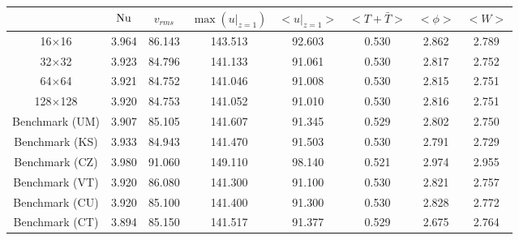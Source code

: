\begin{tabular}{c|ccccccc}
    & $\mathrm{Nu}$ & $v_{rms}$ & $\max(u|_{z=1})$ & $<u|_{z=1}>$ & $<T + \bar{T}>$ & $<\phi>$ & $<W>$ \\
\hline
16$\times$16 & 3.964 & 86.143 & 143.513 & 92.603 & 0.530 & 2.862 & 2.789 \\
32$\times$32 & 3.923 & 84.796 & 141.133 & 91.061 & 0.530 & 2.817 & 2.752 \\
64$\times$64 & 3.921 & 84.752 & 141.046 & 91.008 & 0.530 & 2.815 & 2.751 \\
128$\times$128 & 3.920 & 84.753 & 141.052 & 91.010 & 0.530 & 2.816 & 2.751 \\
\hline
Benchmark (UM) & 3.907 & 85.105 & 141.607 & 91.345 & 0.529 & 2.802 & 2.750 \\
Benchmark (KS) & 3.933 & 84.943 & 141.470 & 91.503 & 0.530 & 2.791 & 2.729 \\
Benchmark (CZ) & 3.980 & 91.060 & 149.110 & 98.140 & 0.521 & 2.974 & 2.955 \\
Benchmark (VT) & 3.920 & 86.080 & 141.300 & 91.100 & 0.530 & 2.821 & 2.757 \\
Benchmark (CU) & 3.920 & 85.100 & 141.400 & 91.300 & 0.530 & 2.828 & 2.772 \\
Benchmark (CT) & 3.894 & 85.150 & 141.517 & 91.377 & 0.529 & 2.675 & 2.764 \\
\end{tabular}
